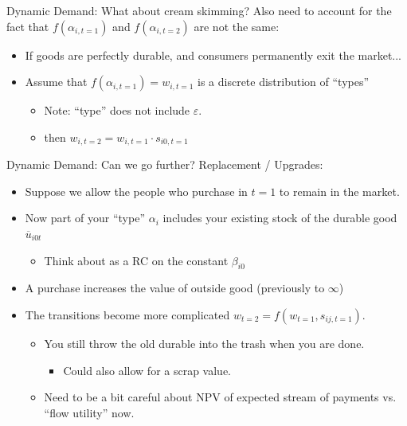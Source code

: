 \documentclass[aspectratio=169,11pt]{beamer}
\begin{document}
\begin{frame}{Dynamic Demand: What about cream skimming?}
Also need to account for the fact that $f(\alpha_{i,t=1})$ and $f(\alpha_{i,t=2})$  are not the same:
\begin{itemize}
\item If goods are perfectly durable, and consumers permanently exit the market...
\item Assume that $f(\alpha_{i,t=1}) = w_{i,t=1}$ is a discrete distribution of ``types''
\begin{itemize}
\item Note: ``type'' does not include $\varepsilon$.
\item then $w_{i,t=2} = w_{i,t=1} \cdot s_{i0,t=1}$
\end{itemize}
\end{itemize}
\end{frame}




\begin{frame}{Dynamic Demand: Can we go further?}
Replacement / Upgrades:
\begin{itemize}
\item Suppose we allow the people who purchase in $t=1$ to remain in the market.
\item Now part of your ``type'' $\alpha_i$ includes your existing stock of the durable good $\overline{u}_{i0t}$
\begin{itemize}
\item Think about as a RC on the constant $\beta_{i0}$
\end{itemize}
\item A purchase increases the value of outside good (previously to $\infty$)
\item The transitions become more complicated $w_{t=2} = f(w_{t=1},s_{ij,t=1})$.
\begin{itemize}
\item You still throw the old durable into the trash when you are done.
\begin{itemize}
\item Could also allow for a scrap value.
\end{itemize}
\item Need to be a bit careful about NPV of expected stream of payments vs. ``flow utility'' now.
\end{itemize}
\end{itemize}
\end{frame}
\end{document}
